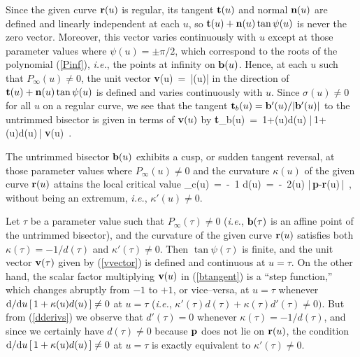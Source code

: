 Since the given curve ${\bf r}(u)$ is regular, its tangent ${\bf t}(u)$
and normal ${\bf n}(u)$ are defined and linearly independent at each $u$,
so ${\bf t}(u)+{\bf n}(u)\tan\psi(u)$ is never the zero vector. Moreover,
this vector varies continuously with $u$ except at those parameter values
where $\psi(u)=\pm\pi/2$, which correspond to the roots of the polynomial
(\ref{Pinf}), {\it i.e.}, the points at infinity on ${\bf b}(u)$. Hence,
at each $u$ such that $P_\infty(u)\not=0$, the unit vector
\be \label{vvector}
{\bf v}(u) \,=\, |\cos\psi(u)\;\!| 
\ee
in the direction of ${\bf t}(u)+{\bf n}(u)\tan\psi(u)$ is defined and
varies continuously with $u$. Since $\sigma(u)\not=0$ for all $u$ on
a regular curve, we see that the tangent ${\bf t}_b(u)={\bf b}'(u) /
|{\bf b}'(u)|$ to the untrimmed bisector is given in terms of ${\bf v}
(u)$ by
\be \label{btangent}
{\bf t}_b(u) \,=\,
{1+\kappa(u)d(u) \over |\,1+\kappa(u)d(u)\,|} \; {\bf v}(u) \,.
\ee

\begin{lma}
The untrimmed bisector ${\bf b}(u)$ exhibits a {\rm cusp}, or sudden
tangent reversal, at those parameter values where $P_\infty(u)\not=0$
and the curvature $\kappa(u)$ of the given curve ${\bf r}(u)$ attains
the local critical value
\be \label{kappacrit}
\kappa_c(u) \,=\, -\ {1 \over d(u)} \,=\,
-\ {2\cos\psi(u) \over |\,{\bf p}-{\bf r}(u)\,|} \,,
\ee
without being an extremum, {\it i.e.}, $\kappa'(u)\not=0$.
\end{lma}

\prf Let $\tau$ be a parameter value such that $P_\infty(\tau)\not
=0$ ({\it i.e.}, ${\bf b}(\tau)$ is an affine point of the untrimmed
bisector), and the curvature of the given curve ${\bf r}(u)$ satisfies
both $\kappa(\tau)=-1/d(\tau)$ and $\kappa'(\tau)\not=0$. Then $\tan
\psi(\tau)$ is finite, and the unit vector ${\bf v}(\tau)$ given by
(\ref{vvector}) is defined and continuous at $u=\tau$. On the other
hand, the scalar factor multiplying ${\bf v}(u)$ in (\ref{btangent})
is a ``step function,'' which changes abruptly from $-1$ to $+1$,
or vice--versa, at $u=\tau$ whenever ${\rm d}/{\rm d} u\,[\,1+\kappa(u)d(u)\,]
\not=0$ at $u=\tau$ ({\it i.e.}, $\kappa'(\tau)d(\tau)+\kappa(\tau)
d'(\tau)\not=0)$. But from (\ref{dderivs}) we observe that $d'(\tau)
=0$ whenever $\kappa(\tau)=-1/d(\tau)$, and since we certainly have
$d(\tau)\not=0$ because ${\bf p}$ does not lie on ${\bf r}(u)$, the
condition ${\rm d}/{\rm d} u\,[\,1+\kappa(u)d(u)\,]\not=0$ at $u=\tau$ is
exactly equivalent to $\kappa'(\tau)\not=0$. \QED

